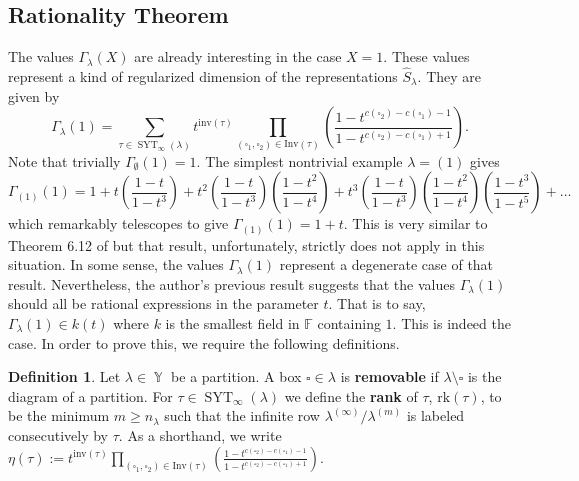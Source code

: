 \documentclass[12pt,reqno]{amsart}
\theoremstyle{definition}
\newtheorem{defn}[thm]{Definition}
\DeclareMathOperator{\SYT}{\mathrm{SYT}}
\DeclareMathOperator{\Par}{\mathbb{Y}}
\begin{document}
\subsection{Rationality Theorem}\label{section conj}

 The values $\Gamma_{\lambda}(X)$ are already interesting in the case $X = 1.$ These values represent a kind of regularized dimension of the representations $\hat{S}_{\lambda}.$ They are given by 
$$\Gamma_{\lambda}(1) = \sum_{\tau \in \SYT_{\infty}(\lambda)} t^{\mathrm{inv}(\tau)} \prod_{(\square_1,\square_2) \in \mathrm{Inv}(\tau)} \left(  \frac{1-t^{c(\square_2)-c(\square_1)-1}}{1-t^{c(\square_2)-c(\square_1)+1}} \right).$$ Note that trivially $\Gamma_{\emptyset}(1) = 1.$ The simplest nontrivial example $\lambda = (1)$ gives 
$$\Gamma_{(1)}(1) = 1 + t\left( \frac{1-t}{1-t^3}\right) + t^2 \left( \frac{1-t}{1-t^3} \right)\left( \frac{1-t^2}{1-t^4} \right)+ t^3 \left( \frac{1-t}{1-t^3} \right)\left( \frac{1-t^2}{1-t^4} \right)\left( \frac{1-t^3}{1-t^5} \right) + \dots$$ which remarkably telescopes to give $\Gamma_{(1)}(1) = 1+t.$ This is very similar to Theorem 6.12 of \cite{BWMurnaghan} but that result, unfortunately, strictly does not apply in this situation. In some sense, the values $\Gamma_{\lambda}(1)$ represent a degenerate case of that result. Nevertheless, the author's previous result suggests that the values $\Gamma_{\lambda}(1)$ should all be rational expressions in the parameter $t.$ That is to say, $\Gamma_{\lambda}(1) \in k(t)$ where $k$ is the smallest field in $\mathbb{F}$ containing $1.$ This is indeed the case. In order to prove this, we require the following definitions.

\begin{defn}
    Let $\lambda \in \Par$ be a partition. A box $\square \in \lambda$ is \textbf{removable} if $\lambda \setminus \square$ is the diagram of a partition. For $\tau \in \SYT_{\infty}(\lambda)$ we define the \textbf{rank} of $\tau$, $\mathrm{rk}(\tau)$, to be the minimum $m \geq n_{\lambda}$ such that the infinite row $\lambda^{(\infty)}/\lambda^{(m)}$ is labeled consecutively by $\tau.$ As a shorthand, we write 
    $\eta(\tau):= t^{\mathrm{inv}(\tau)} \prod_{(\square_1,\square_2) \in \mathrm{Inv}(\tau)} \left(  \frac{1-t^{c(\square_2)-c(\square_1)-1}}{1-t^{c(\square_2)-c(\square_1)+1}} \right).$
\end{defn}
\end{document}
